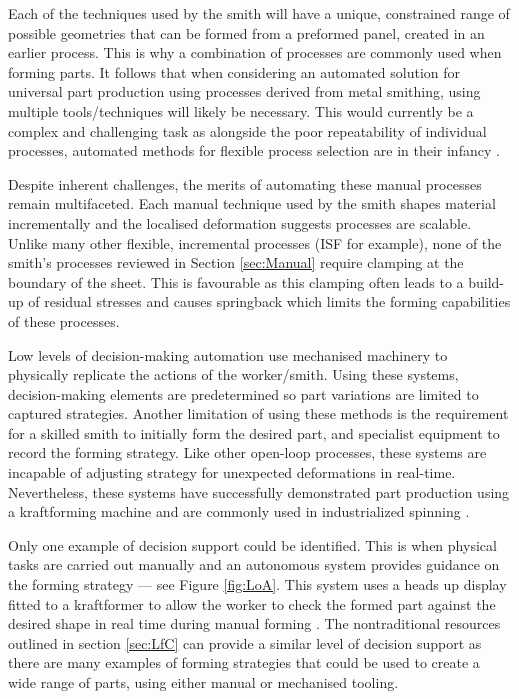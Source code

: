 Each of the techniques used by the smith will have a unique, constrained range of possible geometries that can be formed from a preformed panel, created in an earlier process. This is why a combination of processes are commonly used when forming parts. It follows that when considering an automated solution for universal part production using processes derived from metal smithing, using multiple tools/techniques will likely be necessary. This would currently be a complex and challenging task as alongside the poor repeatability of individual processes, automated methods for flexible process selection are in their infancy  \citep{Hamouche2018ClassificationLearning}.

Despite inherent challenges, the merits of automating these manual processes remain multifaceted. Each manual technique used by the smith shapes material incrementally and the localised deformation suggests processes are scalable. Unlike many other flexible, incremental processes (ISF for example), none of the smith’s processes reviewed in Section \ref{sec:Manual} require clamping at the boundary of the sheet. This is favourable as this clamping often leads to a build-up of residual stresses and causes springback which limits the forming capabilities of these processes.


Low levels of decision-making automation use mechanised machinery to physically replicate the actions of the worker/smith. Using these systems, decision-making elements are predetermined so part variations are limited to captured strategies. Another limitation of using these methods is the requirement for a skilled smith to initially form the desired part, and specialist equipment to record the forming strategy. Like other open-loop processes, these systems are incapable of adjusting strategy for unexpected deformations in real-time. Nevertheless, these systems have successfully demonstrated part production using a kraftforming machine \citep{Hoffman2009AnHandling} and are commonly used in industrialized spinning \citep{ Lloyd1986AnProspective}. 

Only one example of decision support could be identified. This is when physical tasks are carried out manually and an autonomous system provides guidance on the forming strategy --- see Figure \ref{fig:LoA}. This system uses a heads up display fitted to a kraftformer to allow the worker to check the formed part against the desired shape in real time during manual forming \citep{Scherer2010DrivingProducts}. The nontraditional resources outlined in section \ref{sec:LfC} can provide a similar level of decision support as there are many examples of forming strategies that could be used to create a wide range of parts, using either manual or mechanised tooling.

